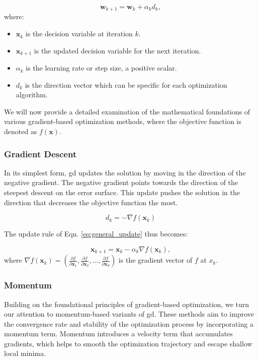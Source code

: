 \begin{equation}
\mathbf{w}_{k+1} = \mathbf{w}_k + \alpha_k d_k,
\label{eq:general_update}
\end{equation}
where:
\begin{itemize}
    \item $\mathbf{x}_k$ is the decision variable at iteration $k$.
    \item $\mathbf{x}_{k+1}$ is the updated decision variable for the next iteration.
    \item $\alpha_k$ is the learning rate or step size, a positive scalar.
    \item $d_k$ is the direction vector which can be specific for each optimization algorithm.
\end{itemize}

\noindent 
We will now provide a detailed examination of the mathematical foundations of various gradient-based optimization methods, where the objective function is denoted as $f(\mathbf{x})$.

\subsubsection{Gradient Descent}
\label{subsubsection:gradient_descent}

\noindent In its simplest form, \ac{gd} updates the solution by moving in the direction of the negative gradient. The negative gradient points towards the direction of the steepest descent on the error surface. This update pushes the solution in the direction that decreases the objective function the most.

\begin{equation}
d_k = -\nabla f(\mathbf{x}_k)
\end{equation}

\noindent The update rule of Eqn. \ref{eq:general_update} thus becomes:

\begin{equation}
\mathbf{x}_{k+1} = \mathbf{x}_k - \alpha_k \nabla f(\mathbf{x}_k),
\label{eq:gd_update}
\end{equation}
where $\nabla f(\mathbf{x}_k) = \left(\frac{\partial f}{\partial \mathbf{x}_1}, \frac{\partial f}{\partial \mathbf{x}_2}, \dots, \frac{\partial f}{\partial \mathbf{x}_d} \right)$ is the gradient vector of $f$ at $x_k$.




\subsubsection{Momentum}
\label{subsubsection:momentum}
Building on the foundational principles of gradient-based optimization, we turn our attention to momentum-based variants of \ac{gd}. These methods aim to improve the convergence rate and stability of the optimization process by incorporating a momentum term.
Momentum introduces a velocity term that accumulates gradients, which helps to smooth the optimization trajectory and escape shallow local minima.


